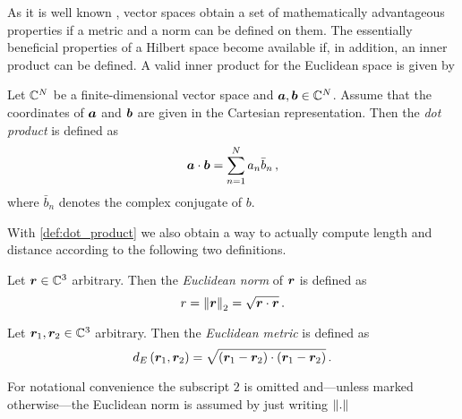 As it is well known \cite{heuser2006}, vector spaces obtain a set of
mathematically advantageous properties if a metric and a norm can be defined on
them.
The essentially beneficial properties of a Hilbert space become available if,
in addition, an inner product can be defined.
A valid inner product for the Euclidean space is given by
\begin{definition}\label{def:dot_product}
	Let $\mathbb{C}^N$ be a finite-dimensional vector space and
	$\pvec{a}, \pvec{b} \in \C^N$.
	Assume that the coordinates of $\pvec{a}$ and $\pvec{b}$ are given in
	the Cartesian representation.
	Then the \emph{dot product}
	is defined as 
	\begin{equation}
		\pvec{a} \cdot \pvec{b} = \sum\limits_{n = 1}^{N} a_n \bar{b}_n \, ,
	\end{equation}
	where $\bar{b}_n$ denotes the complex conjugate of $b$.
\end{definition}

With \cref{def:dot_product} we also obtain a way to actually compute length
and distance according to the following two definitions.

\begin{definition}\label{def:euclidean_norm}
	Let $\pvec{r} \in \C^3$ arbitrary. Then the \emph{Euclidean norm} of
	$\pvec{r}$ is defined as
	\begin{equation}
		r = \euclideanNorm{\pvec{r}} = \sqrt{\pvec{r} \cdot \pvec{r}} \, .
	\end{equation}
\end{definition}

\begin{definition}\label{def:euclidean_metric}
	Let $\pvec{r}_1, \pvec{r}_2 \in \C^3$ arbitrary. Then the \emph{Euclidean
	metric} is defined as
	\begin{equation}
		d_E\left(\pvec{r}_1 , \pvec{r}_2\right) = 
		\sqrt{
			\left(\pvec{r}_1 - \pvec{r}_2\right)
			\cdot
			\left(\pvec{r}_1 - \pvec{r}_2\right)
		} \, .
	\end{equation}
\end{definition}

\begin{remark}
	For notational convenience the subscript $2$ is omitted and---unless
	marked otherwise---the Euclidean norm is assumed by just writing $\left\Vert . \right\Vert$
\end{remark}








